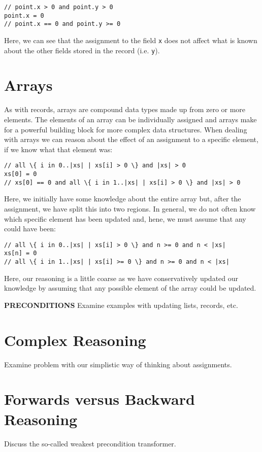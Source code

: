 \begin{lstlisting}
// point.x > 0 and point.y > 0
point.x = 0
// point.x == 0 and point.y >= 0
\end{lstlisting}

Here, we can see that the assignment to the field \lstinline{x} does not affect what is known about the other fields stored in the record (i.e. \lstinline{y}).

\section{Arrays}
As with records, arrays are compound data types made up from zero or more elements.  The elements of an array can be individually assigned and arrays make for a powerful building block for more complex data structures.  When dealing with arrays we can reason about the effect of an assignment to a specific element, if we know what that element was:

\begin{lstlisting}
// all \{ i in 0..|xs| | xs[i] > 0 \} and |xs| > 0
xs[0] = 0
// xs[0] == 0 and all \{ i in 1..|xs| | xs[i] > 0 \} and |xs| > 0
\end{lstlisting}

Here, we initially have some knowledge about the entire array but, after the assignment, we have split this into two regions.  In general, we do not often know which specific element has been updated and, hene, we must assume that any could have been:

\begin{lstlisting}
// all \{ i in 0..|xs| | xs[i] > 0 \} and n >= 0 and n < |xs|
xs[n] = 0
// all \{ i in 1..|xs| | xs[i] >= 0 \} and n >= 0 and n < |xs|
\end{lstlisting}

Here, our reasoning is a little coarse as we have conservatively updated our knowledge by assuming that any possible element of the array could be updated.

{\bf PRECONDITIONS}
Examine examples with updating lists, records, etc.

\section{Complex Reasoning}
Examine problem with our simplistic way of thinking about assignments.

\section{Forwards versus Backward Reasoning}
Discuss the so-called weakest precondition transformer.


